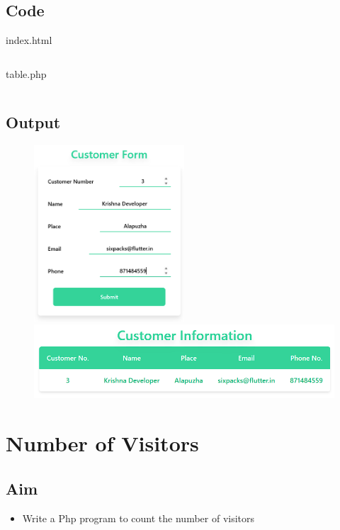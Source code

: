\documentclass{article}
\begin{document}
\subsection{Code}
index.html
\inputminted[frame=lines, breaklines, breakanywhere, numberblanklines=false]{html}{./prog_21/index.html}
table.php
\inputminted[frame=lines, breaklines, breakanywhere, numberblanklines=false]{php}{./prog_21/table.php}

\subsection{Output}
\begin{figure}[h!]
	\centering
	\includegraphics[width=0.5\textwidth]{./Assets/p2101.png}
	\includegraphics[width=1\textwidth]{./Assets/p2102.png}
\end{figure}
\newpage

\section{Number of Visitors}
\subsection{Aim}
\begin{itemize}
  \item Write a Php program to count the number of visitors
\end{itemize}
\end{document}
